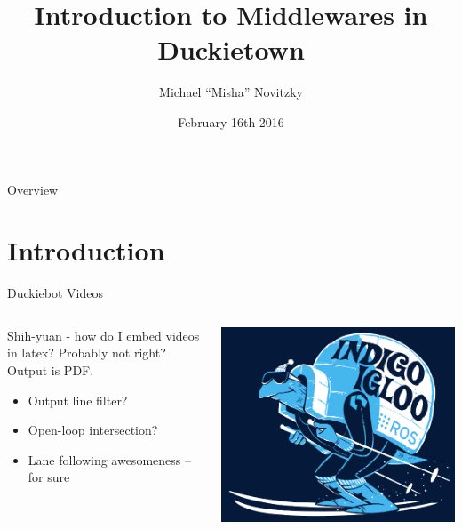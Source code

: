 \documentclass{beamer}
\author[Michael ``Misha'' Novitzky]{Michael ``Misha'' Novitzky}
\title[Introduction to Middlewares in Duckietown]{Introduction to Middlewares in Duckietown}
\institute[Duckietown MIT]{Duckietown, MIT}
\date[Feb. 16th, 2016]{February 16th 2016}
\begin{document}

\begin{frame}[plain,label=titlepage,noframenumbering] %
	\titlepage
\end{frame}

\begin{frame}[label=overview]{Overview}
	\tableofcontents
\end{frame}


\section{Introduction}

\begin{frame}{Duckiebot Videos}
\begin{columns}
	\begin{column}{0.55\textwidth}
		Shih-yuan - how do I embed \alert{videos} in latex? Probably not right? Output is PDF.
		\begin{itemize}
			\item Output line filter?
			\item Open-loop intersection?
			\item Lane following awesomeness -- for sure
		\end{itemize}
	\end{column}
	\begin{column}{0.45\textwidth}
		\centering
		\includegraphics[width=\textwidth]{fig/indigoigloo_600.png}
	\end{column}
\end{columns}
\end{frame}
\end{document}
